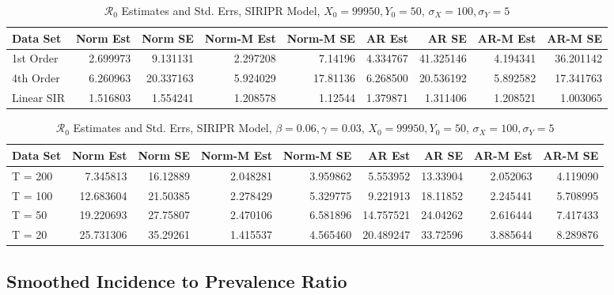 \message{ !name(draft_v13.tex)}\documentclass[12pt]{article}
\newcommand{\rr}{\ensuremath{\mathcal{R}_0}}
\begin{document}
\begin{table}[H]
	
	\caption{\label{tab:}$\rr$ Estimates and Std. Errs, SIRIPR Model,
		$X_0 = 99950, Y_0 = 50$, $\sigma_X = 100, \sigma_Y = 5$}
	\centering
	\begin{footnotesize}
		\begin{tabular}[t]{l|r|r|r|r|r|r|r|r}
			\hline
			Data Set & Norm Est & Norm SE & Norm-M Est & Norm-M SE & AR Est & AR SE & AR-M Est & AR-M SE\\
			\hline
			1st Order & 2.699973 & 9.131131 & 2.297208 & 7.14196 & 4.334767 & 41.325146 & 4.194341 & 36.201142\\
			\hline
			4th Order & 6.260963 & 20.337163 & 5.924029 & 17.81136 & 6.268500 & 20.536192 & 5.892582 & 17.341763\\
			\hline
			Linear SIR & 1.516803 & 1.554241 & 1.208578 & 1.12544 & 1.379871 & 1.311406 & 1.208521 & 1.003065\\
			\hline
		\end{tabular}
	\end{footnotesize}
\end{table}

\begin{table}[H]
	
	\caption{\label{tab:}$\rr$ Estimates and Std. Errs, SIRIPR Model,
		$\beta = 0.06, \gamma = 0.03$, $X_0 = 99950, Y_0 = 50$, $\sigma_X = 100, \sigma_Y = 5$}
	\centering
	\begin{tabular}[t]{l|r|r|r|r|r|r|r|r}
		\hline
		Data Set & Norm Est & Norm SE & Norm-M Est & Norm-M SE & AR Est & AR SE & AR-M Est & AR-M SE\\
		\hline
		T = 200 & 7.345813 & 16.12889 & 2.048281 & 3.959862 & 5.553952 & 13.33904 & 2.052063 & 4.119090\\
		\hline
		T = 100 & 12.683604 & 21.50385 & 2.278429 & 5.329775 & 9.221913 & 18.11852 & 2.245441 & 5.708995\\
		\hline
		T = 50 & 19.220693 & 27.75807 & 2.470106 & 6.581896 & 14.757521 & 24.04262 & 2.616444 & 7.417433\\
		\hline
		T = 20 & 25.731306 & 35.29261 & 1.415537 & 4.565460 & 20.489247 & 33.72596 & 3.885644 & 8.289876\\
		\hline
	\end{tabular}
\end{table}

\subsection{Smoothed Incidence to Prevalence Ratio}
\end{document}
